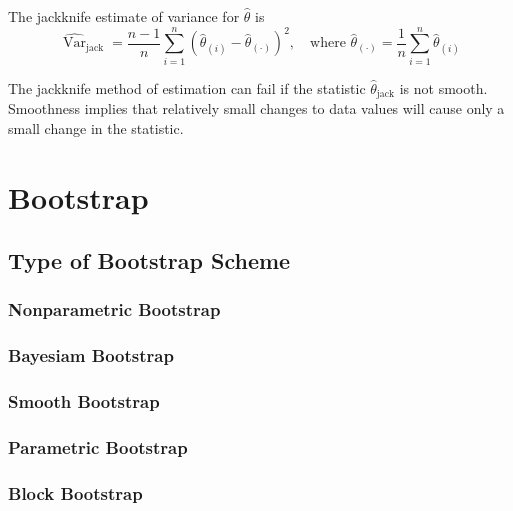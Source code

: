 The jackknife estimate of variance for $\hat{\theta}$ is
\begin{equation}
    \widehat{\operatorname{Var}}_{\text{jack}}=\frac{n-1}{n}\sum_{i=1}^{n}\left(\hat{\theta}_{(i)}-\hat{\theta}_{(\cdot)}\right)^{2},\quad\text{where }\hat{\theta}_{(\cdot)}=\frac{1}{n}\sum_{i=1}^{n}\hat{\theta}_{(i)}
\end{equation}

The jackknife method of estimation can fail if the statistic $\hat{\theta}_{\text{jack}}$ is not smooth. Smoothness
implies that relatively small changes to data values will cause only a small change in the
statistic.

\begin{example}

\end{example}

\begin{example}

\end{example}

\section{Bootstrap}

\subsection{Type of Bootstrap Scheme}


\subsubsection{Nonparametric Bootstrap}

\subsubsection{Bayesiam Bootstrap}

\subsubsection{Smooth Bootstrap}

\subsubsection{Parametric Bootstrap}

\subsubsection{Block Bootstrap}